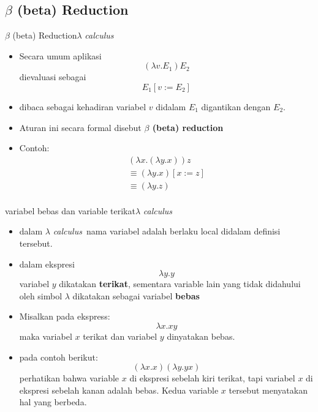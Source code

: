 \documentclass[aspectratio=1610,10pt,handout]{beamer}
\newcommand{\lc}{$\lambda$ {\it calculus}\ }
\begin{document}
\subsection{$\beta$ (beta) Reduction}
\begin{frame}{$\beta$ (beta) Reduction}{\lc}

	\begin{itemize}
		\item Secara umum aplikasi $$(\lambda v. E_1) E_2$$ dievaluasi sebagai $$E_1[v:=E_2]$$
		\item dibaca sebagai kehadiran variabel $v$ didalam $E_1$ digantikan dengan $E_2$.
		\item Aturan ini secara formal disebut {\bf $\beta$ (beta) reduction}
		\item Contoh:
		\[
		\begin{array}{l}
		(\lambda x. (\lambda y. x)) z \\
		\equiv (\lambda y. x)[x:= z] \\
		\equiv (\lambda y. z)\\
		\end{array}
		\]
	\end{itemize}
\end{frame}


\begin{frame}{variabel bebas dan variable terikat}{\lc}

	\begin{itemize}
		\item dalam \lc nama variabel adalah berlaku local didalam definisi tersebut.
		\item dalam ekspresi $$\lambda y. y$$ variabel $y$ dikatakan {\bf terikat}, sementara variable lain yang tidak didahului oleh simbol $\lambda$ dikatakan sebagai variabel {\bf bebas}
		\item Misalkan pada ekspress:
		$$\lambda x. xy$$
		maka variabel $x$ terikat dan variabel $y$ dinyatakan bebas.
		\pause
		\item pada contoh berikut: $$(\lambda x. x)(\lambda y. yx)$$
		perhatikan bahwa variable $x$ di ekspresi sebelah kiri terikat, tapi variabel $x$ di ekspresi sebelah kanan adalah bebas. Kedua variable $x$ tersebut menyatakan hal yang berbeda.

	\end{itemize}
\end{frame}
\end{document}
